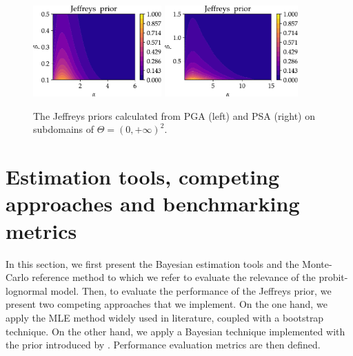         \begin{figure}[!ht]
            \centering
            {\includegraphics[height=3.5cm]{figures/PREM/Jeff_prior_PGA-2.pdf}}\hspace*{0.5cm}
            {\includegraphics[height=3.5cm]{figures/PREM/Jeff_prior_PSA-1.pdf}}
            \caption{The Jeffreys priors calculated from PGA (left) and PSA (right) on subdomains of $\Theta=(0,+\infty)^2$.}
             \label{uncIM:fig:jeff_prior}
        \end{figure}

\section{Estimation tools, competing approaches and benchmarking metrics} \label{uncIM:sec:tools}

    In this section, we first present the Bayesian estimation tools and the Monte-Carlo reference method to which we refer to evaluate the relevance of the probit-lognormal model. Then, to evaluate the performance of the Jeffreys prior, we present two competing approaches that we implement. On the one hand, we apply the MLE method widely used in literature, coupled with a bootstrap technique. On the other hand, we apply a Bayesian technique implemented with the prior introduced by \citet{straub_improved_2008}. Performance evaluation metrics are then defined.

